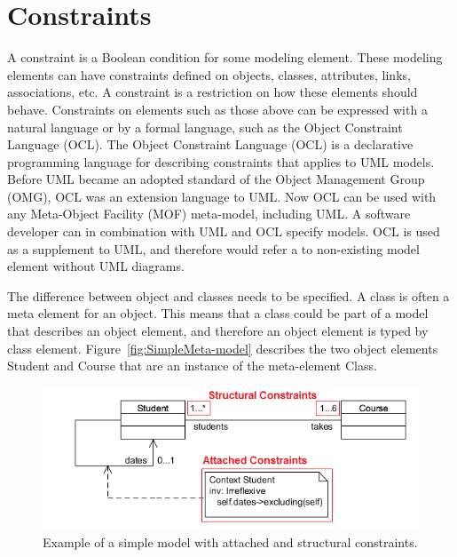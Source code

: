 


 
\section{Constraints}

A constraint is a Boolean condition for some modeling element. These modeling
elements can have constraints defined on objects, classes, attributes,
links, associations, etc. A constraint is a restriction on how these
elements should behave. Constraints on elements such as those above can be
expressed with a natural language or by a formal language, such as the
Object Constraint Language\cite{OCL} (OCL). The Object Constraint Language (OCL)
is a declarative programming language for describing constraints that applies to
UML models. Before UML became an adopted standard of the Object Management Group
(OMG), OCL was an extension language to UML. Now OCL can be used with any
Meta-Object Facility (MOF) meta-model, including UML. A software developer
can in combination with UML and OCL specify models. OCL is used as a supplement
to UML, and therefore would refer a to non-existing model element without UML
diagrams\cite{Warmer:2003:OCL:861416}.

The difference between object and classes needs to be specified. A class
is often a meta element for an object. This means that a class could be part of
a model that describes an object element, and therefore an object element is
typed by class element\cite{OO_UML}. Figure~\ref{fig:SimpleMeta-model} describes
the two object elements Student and Course that are an instance of the
meta-element Class.

\begin{figure}[H]
	\centering
	\includegraphics[scale=0.7]{./Figures/Constraints.png}
	\caption[Simple model with constraints]
	{Example of a simple model with attached and structural constraints.}
	\label{fig:Constraints}
\end{figure}

